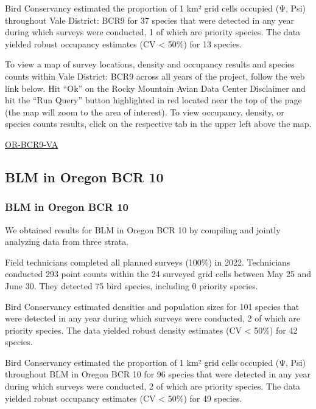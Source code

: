 \documentclass[
  letterpaper,
  DIV=11,
  numbers=noendperiod,
  oneside]{scrreprt}
\begin{document}
Bird Conservancy estimated the proportion of 1 km² grid cells occupied
(Ψ, Psi) throughout Vale District: BCR9 for 37 species that were
detected in any year during which surveys were conducted, 1 of which are
priority species. The data yielded robust occupancy estimates (CV
\textless{} 50\%) for 13 species.

To view a map of survey locations, density and occupancy results and
species counts within Vale District: BCR9 across all years of the
project, follow the web link below. Hit ``Ok'' on the Rocky Mountain
Avian Data Center Disclaimer and hit the ``Run Query'' button
highlighted in red located near the top of the page (the map will zoom
to the area of interest). To view occupancy, density, or species counts
results, click on the respective tab in the upper left above the map.

\href{http://www.rmbo.org/new_site/adc/QueryWindow.aspx\#N4IgzgLgTghhCuBbEAuABCA8gJQLQCEBhbATlwDUBBdfeKAUxnjQHsAzNAGRgDsATNAFleMAOb1E9HhDS405GABt6aACIBLSFHUBjCCAC+QA}{OR-BCR9-VA}

\hypertarget{blm-in-oregon-bcr-10}{%
\subsection{BLM in Oregon BCR 10}\label{blm-in-oregon-bcr-10}}

\hypertarget{blm-in-oregon-bcr-10-1}{%
\subsubsection{BLM in Oregon BCR 10}\label{blm-in-oregon-bcr-10-1}}

We obtained results for BLM in Oregon BCR 10 by compiling and jointly
analyzing data from three strata.

Field technicians completed all planned surveys (100\%) in 2022.
Technicians conducted 293 point counts within the 24 surveyed grid cells
between May 25 and June 30. They detected 75 bird species, including 0
priority species.

Bird Conservancy estimated densities and population sizes for 101
species that were detected in any year during which surveys were
conducted, 2 of which are priority species. The data yielded robust
density estimates (CV \textless{} 50\%) for 42 species.

Bird Conservancy estimated the proportion of 1 km² grid cells occupied
(Ψ, Psi) throughout BLM in Oregon BCR 10 for 96 species that were
detected in any year during which surveys were conducted, 2 of which are
priority species. The data yielded robust occupancy estimates (CV
\textless{} 50\%) for 49 species.
\end{document}
